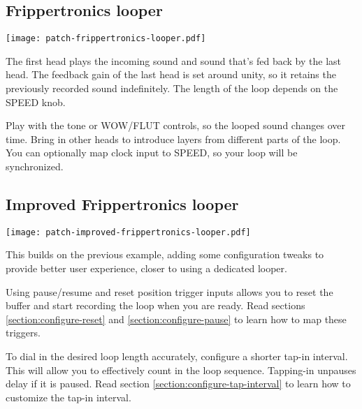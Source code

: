 \documentclass[11pt]{article}
\begin{document}
\newpage
\noindent\begin{minipage}[t]{0.45\textwidth}\setlength{\parskip}{6pt}

\subsection{Frippertronics looper}

\vspace{5mm}\begin{center}\texttt{[image: patch-frippertronics-looper.pdf]}\vspace{5mm}\end{center}

The first head plays the incoming sound and sound that's fed back by the last
head. The feedback gain of the last head is set around unity, so it retains
the previously recorded sound indefinitely. The length of the loop depends on
the SPEED knob.

Play with the tone or WOW/FLUT controls, so the looped sound changes over time.
Bring in other heads to introduce layers from different parts of the loop.
You can optionally map clock input to SPEED, so your loop will be synchronized.

\end{minipage}\begin{minipage}{0.05\textwidth}\phantom{ }\end{minipage}\begin{minipage}[t]{0.45\textwidth}\setlength{\parskip}{6pt}


\subsection{Improved Frippertronics looper}

\vspace{5mm}\begin{center}\texttt{[image: patch-improved-frippertronics-looper.pdf]}\vspace{5mm}\end{center}

This builds on the previous example, adding some configuration tweaks to provide
better user experience, closer to using a dedicated looper.

Using pause/resume and reset position trigger inputs allows you to reset the
buffer and start recording the loop when you are ready. Read sections
\ref{section:configure-reset} and \ref{section:configure-pause} to learn how to
map these triggers.

To dial in the desired loop length accurately, configure a shorter tap-in
interval. This will allow you to effectively count in the loop sequence.
Tapping-in unpauses delay if it is paused. Read section
\ref{section:configure-tap-interval} to learn how to customize the tap-in
interval.

\end{minipage}
\end{document}
